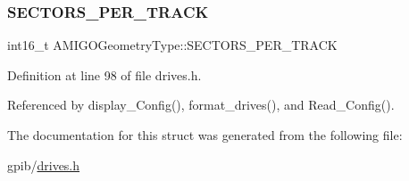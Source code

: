 \subsubsection{\texorpdfstring{S\+E\+C\+T\+O\+R\+S\+\_\+\+P\+E\+R\+\_\+\+T\+R\+A\+CK}{SECTORS\_PER\_TRACK}}
{\footnotesize\ttfamily int16\+\_\+t A\+M\+I\+G\+O\+Geometry\+Type\+::\+S\+E\+C\+T\+O\+R\+S\+\_\+\+P\+E\+R\+\_\+\+T\+R\+A\+CK}



Definition at line 98 of file drives.\+h.



Referenced by display\+\_\+\+Config(), format\+\_\+drives(), and Read\+\_\+\+Config().



The documentation for this struct was generated from the following file\+:\begin{DoxyCompactItemize}
\item 
gpib/\hyperlink{drives_8h}{drives.\+h}\end{DoxyCompactItemize}
